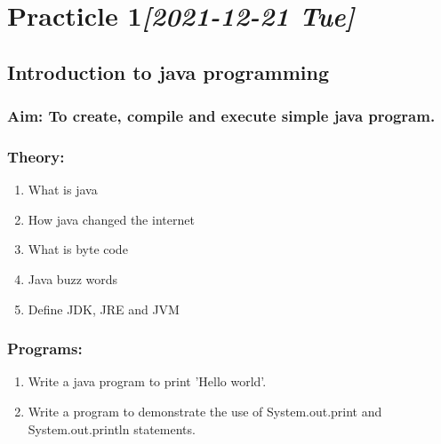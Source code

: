 \documentclass[11pt]{article}
\author{looph0le}
\date{\today}
\title{}
\begin{document}
\tableofcontents

\section{Practicle 1\textit{[2021-12-21 Tue]}}
\label{sec:org9cfaa17}
\subsection{Introduction to java programming}
\label{sec:org4d32534}
\subsubsection{Aim: To create, compile and execute simple java program.}
\label{sec:orga3d4db6}
\subsubsection{Theory:}
\label{sec:orgc070970}
\begin{enumerate}
\item What is java
\item How java changed the internet
\item What is byte code
\item Java buzz words
\item Define JDK, JRE and JVM
\end{enumerate}
\subsubsection{Programs:}
\label{sec:org44ffebe}
\begin{enumerate}
\item Write a java program to print 'Hello world'.
\item Write a program to demonstrate the use of System.out.print and System.out.println statements.
\end{enumerate}
\end{document}
